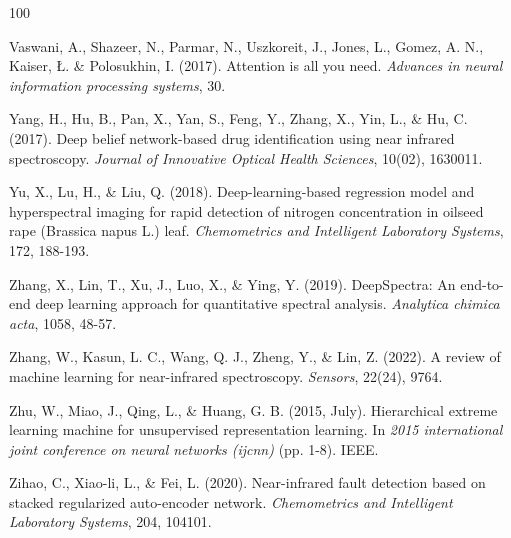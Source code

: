 \documentclass[10pt, a4paper, oneside]{article}
\begin{document}
\begin{thebibliography}{100}
{ Vaswani, A., Shazeer, N., Parmar, N., Uszkoreit, J., Jones, L., Gomez, A. N., Kaiser, {\L}. \& Polosukhin, I. (2017). Attention is all you need. \textit{Advances in neural information processing systems}, 30.

 Yang, H., Hu, B., Pan, X., Yan, S., Feng, Y., Zhang, X., Yin, L., \& Hu, C. (2017). Deep belief network-based drug identification using near infrared spectroscopy. \textit{Journal of Innovative Optical Health Sciences}, 10(02), 1630011.

 Yu, X., Lu, H., \& Liu, Q. (2018). Deep-learning-based regression model and hyperspectral imaging for rapid detection of nitrogen concentration in oilseed rape (Brassica napus L.) leaf. \textit{Chemometrics and Intelligent Laboratory Systems}, 172, 188-193.

 Zhang, X., Lin, T., Xu, J., Luo, X., \& Ying, Y. (2019). DeepSpectra: An end-to-end deep learning approach for quantitative spectral analysis. \textit{Analytica chimica acta}, 1058, 48-57.

 Zhang, W., Kasun, L. C., Wang, Q. J., Zheng, Y., \& Lin, Z. (2022). A review of machine learning for near-infrared spectroscopy. \textit{Sensors}, 22(24), 9764.

 Zhu, W., Miao, J., Qing, L., \& Huang, G. B. (2015, July). Hierarchical extreme learning machine for unsupervised representation learning. In \textit{2015 international joint conference on neural networks (ijcnn)} (pp. 1-8). IEEE.

 Zihao, C., Xiao-li, L., \& Fei, L. (2020). Near-infrared fault detection based on stacked regularized auto-encoder network. \textit{Chemometrics and Intelligent Laboratory Systems}, 204, 104101.
}
\end{thebibliography}
\end{document}
